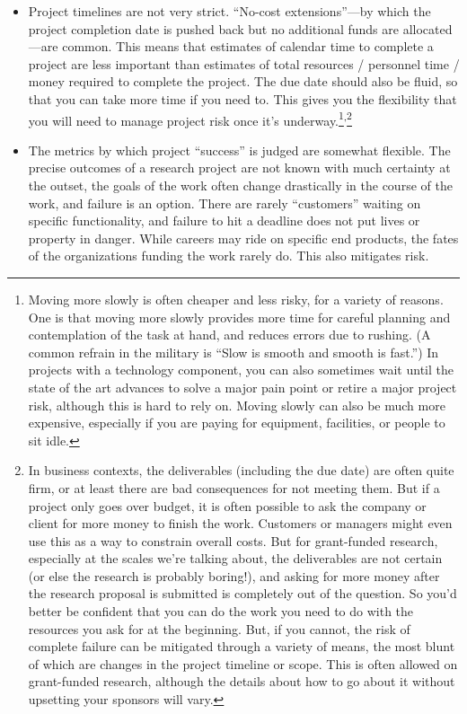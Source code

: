 \documentclass[12pt,oneside]{book}
\begin{document}
\begin{itemize}[wide, labelwidth=!, labelindent=0pt, font=\bfseries]
\item Project timelines are not very strict. ``No-cost extensions''---by which the project completion date is pushed back but no additional funds are allocated---are common. This means that estimates of calendar time to complete a project are less important than estimates of total resources / personnel time / money required to complete the project. The due date should also be fluid, so that you can take more time if you need to. This gives you the flexibility that you will need to manage project risk once it's underway.\footnote{ Moving more slowly is often cheaper and less risky, for a variety of reasons. One is that moving more slowly provides more time for careful planning and contemplation of the task at hand, and reduces errors due to rushing. (A common refrain in the military is ``Slow is smooth and smooth is fast.'') In projects with a technology component, you can also sometimes wait until the state of the art advances to solve a major pain point or retire a major project risk, although this is hard to rely on. Moving slowly can also be much more expensive, especially if you are paying for equipment, facilities, or people to sit idle.}\textsuperscript{,}\footnote{In business contexts, the deliverables (including the due date) are often quite firm, or at least there are bad consequences for not meeting them. But if a project only goes over budget, it is often possible to ask the company or client for more money to finish the work. Customers or managers might even use this as a way to constrain overall costs. But for grant-funded research, especially at the scales we’re talking about, the deliverables are not certain (or else the research is probably boring!), and asking for more money after the research proposal is submitted is completely out of the question. So you’d better be confident that you can do the work you need to do with the resources you ask for at the beginning. But, if you cannot, the risk of complete failure can be mitigated through a variety of means, the most blunt of which are changes in the project timeline or scope. This is often allowed on grant-funded research, although the details about how to go about it without upsetting your sponsors will vary.}
\item The metrics by which project ``success'' is judged are somewhat flexible. The precise outcomes of a research project are not known with much certainty at the outset, the goals of the work often change drastically in the course of the work, and failure is an option. There are rarely ``customers'' waiting on specific functionality, and failure to hit a deadline does not put lives or property in danger. While careers may ride on specific end products, the fates of the organizations funding the work rarely do. This also mitigates risk.

\end{itemize}
\end{document}
